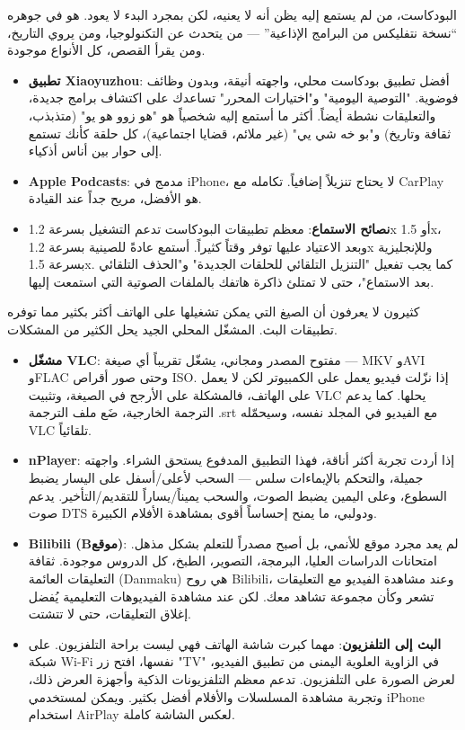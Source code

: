 
البودكاست، من لم يستمع إليه يظن أنه لا يعنيه، لكن بمجرد البدء لا يعود. هو في جوهره “نسخة نتفليكس من البرامج الإذاعية” — من يتحدث عن التكنولوجيا، ومن يروي التاريخ، ومن يقرأ القصص، كل الأنواع موجودة.

\begin{itemize}
  \item \textbf{تطبيق Xiaoyuzhou}: أفضل تطبيق بودكاست محلي، واجهته أنيقة، وبدون وظائف فوضوية. "التوصية اليومية" و"اختيارات المحرر" تساعدك على اكتشاف برامج جديدة، والتعليقات نشطة أيضاً. أكثر ما أستمع إليه شخصياً هو "هو زوو هو يو" (متذبذب، ثقافة وتاريخ) و"بو خه شي يي" (غير ملائم، قضايا اجتماعية)، كل حلقة كأنك تستمع إلى حوار بين أناس أذكياء.
  \item \textbf{Apple Podcasts}: مدمج في iPhone، لا يحتاج تنزيلاً إضافياً. تكامله مع CarPlay هو الأفضل، مريح جداً عند القيادة.
  \item \textbf{نصائح الاستماع}: معظم تطبيقات البودكاست تدعم التشغيل بسرعة 1.2x أو 1.5x، وبعد الاعتياد عليها توفر وقتاً كثيراً. أستمع عادةً للصينية بسرعة 1.2x وللإنجليزية بسرعة 1.5x. كما يجب تفعيل "التنزيل التلقائي للحلقات الجديدة" و"الحذف التلقائي بعد الاستماع"، حتى لا تمتلئ ذاكرة هاتفك بالملفات الصوتية التي استمعت إليها.
\end{itemize}


كثيرون لا يعرفون أن الصيغ التي يمكن تشغيلها على الهاتف أكثر بكثير مما توفره تطبيقات البث. المشغّل المحلي الجيد يحل الكثير من المشكلات.

\begin{itemize}
  \item \textbf{مشغّل VLC}: مفتوح المصدر ومجاني، يشغّل تقريباً أي صيغة — MKV وAVI وFLAC وحتى صور أقراص ISO. إذا نزّلت فيديو يعمل على الكمبيوتر لكن لا يعمل على الهاتف، فالمشكلة على الأرجح في الصيغة، وتثبيت VLC يحلها. كما يدعم الترجمة الخارجية، ضَع ملف الترجمة .srt مع الفيديو في المجلد نفسه، وسيحمّله VLC تلقائياً.
  \item \textbf{nPlayer}: إذا أردت تجربة أكثر أناقة، فهذا التطبيق المدفوع يستحق الشراء. واجهته جميلة، والتحكم بالإيماءات سلس — السحب لأعلى/أسفل على اليسار يضبط السطوع، وعلى اليمين يضبط الصوت، والسحب يميناً/يساراً للتقديم/التأخير. يدعم صوت DTS ودولبي، ما يمنح إحساساً أقوى بمشاهدة الأفلام الكبيرة.
  \item \textbf{Bilibili (Bموقع)}: لم يعد مجرد موقع للأنمي، بل أصبح مصدراً للتعلم بشكل مذهل. امتحانات الدراسات العليا، البرمجة، التصوير، الطبخ، كل الدروس موجودة. ثقافة التعليقات العائمة (Danmaku) هي روح Bilibili، وعند مشاهدة الفيديو مع التعليقات تشعر وكأن مجموعة تشاهد معك. لكن عند مشاهدة الفيديوهات التعليمية يُفضل إغلاق التعليقات، حتى لا تتشتت.
  \item \textbf{البث إلى التلفزيون}: مهما كبرت شاشة الهاتف فهي ليست براحة التلفزيون. على شبكة Wi-Fi نفسها، افتح زر "TV" في الزاوية العلوية اليمنى من تطبيق الفيديو، لعرض الصورة على التلفزيون. تدعم معظم التلفزيونات الذكية وأجهزة العرض ذلك، وتجربة مشاهدة المسلسلات والأفلام أفضل بكثير. ويمكن لمستخدمي iPhone استخدام AirPlay لعكس الشاشة كاملة.
\end{itemize}

